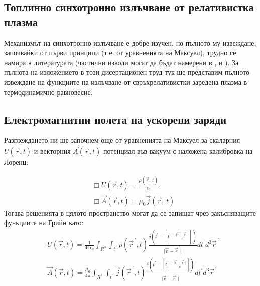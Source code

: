 \appendixpage
\begin{appendices}

	\section{Топлинно синхотронно излъчване от релативистка плазма}
	
	Механизмът на синхотронно излъчване е добре изучен, но пълното му извеждане, започвайки от първи принципи (т.е. от уравненията на Максуел), трудно се намира в литературата (частични изводи могат да бъдат намерени в \cite{Schwigner1949}, \cite{Westfold1959} и \cite{WESTFOLD_II}). За пълнота на изложението в този дисертационен труд тук ще представим пълното извеждане на функциите на излъчване от свръхрелативистки заредена плазма в термодинамично равновесие.
	
	\subsection{Електромагнитни полета на ускорени заряди}
	
	Разглеждането ни ще започнем още от уравненията на Максуел за скаларния $U\left(\vec{r},t\right)$ и векторния $\vec{A}\left(\vec{r},t\right)$ потенциал във вакуум с наложена калибровка на Лоренц:
	
	\begin{equation}
		\begin{split}
		&\Box U\left(\vec{r},t\right) = \frac{\rho(\vec{r},\,t)}{\epsilon_0},\\
	    &\Box \vec{A}\left(\vec{r},t\right) = \mu_0\vec{j}(\vec{r},\,t)
		\end{split}
	\end{equation}
	Тогава решенията в цялото пространство могат да се запишат чрез закъсняващите функциите на Грийн като:
	\begin{equation}
		\begin{split}
			&U\left(\vec{r},t\right) = \frac{1}{4\pi\epsilon_0}\int_{R^3}\int_{t^{\,\prime}} \rho(\vec{r}^{\,\prime},t)\frac{\delta\left(t^\prime - \left[t - \frac{\vert \vec{r} - \vec{r}^{\,\prime}\vert}{c}\right]\right)}{\vert \vec{r} - \vec{r}^{\,\prime}\vert}dt^\prime d^3\vec{r}^{\,\prime}\\
			&\vec{A}\left(\vec{r},t\right) = \frac{\mu_0}{4\pi}\int_{R^3}\int_{t^{\,\prime}} \vec{j}(\vec{r}^{\,\prime},t)\frac{\delta\left(t^\prime - \left[t - \frac{\vert \vec{r} - \vec{r}^{\,\prime}\vert}{c}\right]\right)}{\vert \vec{r} - \vec{r}^{\,\prime}\vert}dt^\prime		d^3\vec{r}^{\,\prime} 
		\end{split}
	\end{equation} 
	

\end{appendices}

